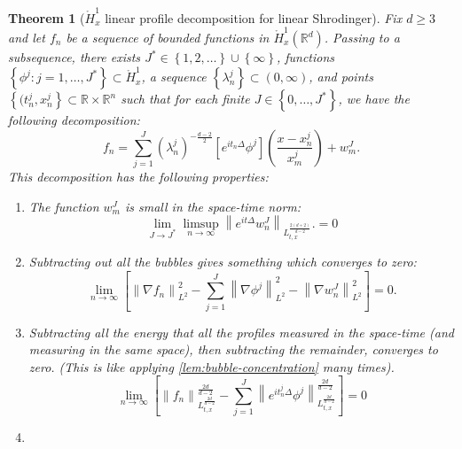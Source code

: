\documentclass{article}
\newtheorem{theorem}{Theorem}
\def\R{\mathbb{R}} %
\newcommand\norm[1]{\left\lVert#1\right\rVert}
\begin{document}
\begin{theorem}[$\mathring{H}_x^1$ linear profile decomposition for linear Shrodinger]
  \label{thm:H1x-linear-profile-decomposition-for-linear-shrodinger}
  Fix $d \geq 3$ and let $f_{n}$ be a sequence of bounded functions in
  $\mathring{H}_{x}^{1}(\R^d)$. Passing to a subsequence, there exists $J^{*}\in
  \left\{1,2,\ldots\right\}\cup \left\{\infty\right\}$, functions
  $\left\{\phi^{j}: j=1,\ldots,J^{*}\right\}\subset \mathring{H}_{x}^{1}$,  a
  sequence $\left\{\lambda_{n}^{j}\right\}\subset (0,\infty)$, and points
  $\left\{(t_{n}^{j},x_{n}^{j}\right\}\subset \R\times\R^{n}$ such that for each
  finite $J\in \left\{0,\ldots,J^{*}\right\}$, we have the following
  decomposition:
  \begin{equation}\label{eq:linear-shrodinger-profile-decomposition}
    f_{n}= \sum_{j=1}^{J} \left( \lambda_{n}^{j} \right)^{-\frac{d-2}{2}}\left[ e^{it_{n}\Delta}\phi^{j} \right]\left( \frac{x-x_{n}^{j}}{x_{m}^{j}} \right) + w_{m}^{J}.
  \end{equation}
  This decomposition has the following properties:
  \begin{enumerate}
    \item The function $w_{m}^{J}$ is small in the space-time norm:
    \begin{equation*}
      \lim_{J\to J^{*}} \limsup_{n\to\infty} \norm{e^{it\Delta}w_{n}^{J}}_{L_{t,x}^{\frac{2(d+2)}{d-2}}}.
      = 0
    \end{equation*}
    \item Subtracting out all the bubbles gives something which converges to
    zero:
    \begin{equation*}
      \lim_{n\to\infty} \left[ \norm{\nabla f_{n}}_{L^{2}}^{2}- \sum_{j=1}^{J}\norm{\nabla \phi^{j}}_{L^{2}}^{2}- \norm{\nabla w_{n}^{J}}_{L^{2}}^{2}  \right]  = 0.
    \end{equation*}
    \item Subtracting all the energy that all the profiles measured in the
    space-time (and measuring in the same space), then subtracting the
    remainder, converges to zero. (This is like applying
    \cref{lem:bubble-concentration} many times).
    \begin{equation*}
      \lim_{n\to\infty}
      \left[ \norm{f_{n}}_{L_{t,x}^{\frac{2d}{d-2}}}^{\frac{2d}{d-2}}
        -\sum_{j=1}^{J}
        \norm{e^{it_{n}^{j}\Delta}\phi^{j}}_{L_{t,x}^{\frac{2d}{d-2}}}^{\frac{2d}{d-2}}
      \right] 
      = 0
    \end{equation*}
    \item

\end{enumerate}
\end{theorem}
\end{document}
